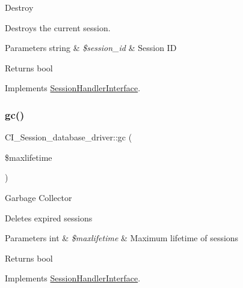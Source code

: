 Destroy

Destroys the current session.


\begin{DoxyParams}[1]{Parameters}
string & {\em \$session\+\_\+id} & Session ID \\
\hline
\end{DoxyParams}
\begin{DoxyReturn}{Returns}
bool 
\end{DoxyReturn}


Implements \mbox{\hyperlink{interface_session_handler_interface}{Session\+Handler\+Interface}}.

\mbox{\label{class_c_i___session__database__driver_ac3b48d4f20b1e205cd4934eaecdfd8e9}} 
\subsubsection{\texorpdfstring{gc()}{gc()}}
{\footnotesize\ttfamily C\+I\+\_\+\+Session\+\_\+database\+\_\+driver\+::gc (\begin{DoxyParamCaption}\item[{}]{\$maxlifetime }\end{DoxyParamCaption})}

Garbage Collector

Deletes expired sessions


\begin{DoxyParams}[1]{Parameters}
int & {\em \$maxlifetime} & Maximum lifetime of sessions \\
\hline
\end{DoxyParams}
\begin{DoxyReturn}{Returns}
bool 
\end{DoxyReturn}


Implements \mbox{\hyperlink{interface_session_handler_interface}{Session\+Handler\+Interface}}.

\mbox{\label{class_c_i___session__database__driver_a8d72222ab3525a8d6316c5b7c6b5571c}} 
